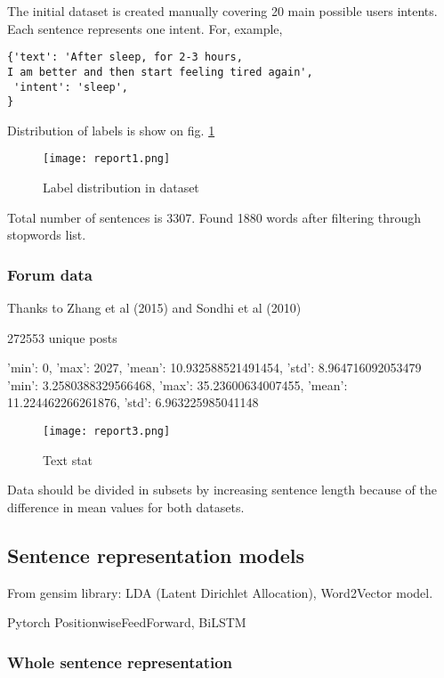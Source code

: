 \documentclass[11pt]{article}
\begin{document}
The initial dataset is created manually covering 20 main possible users intents. Each sentence represents one intent. For, example,

\begin{lstlisting}
{'text': 'After sleep, for 2-3 hours, 
I am better and then start feeling tired again',
 'intent': 'sleep',
}
\end{lstlisting}

Distribution of labels is show on fig. \ref{figure:name}

 \begin{figure}[h]
 	\centering
 	\texttt{[image: report1.png]}
	\caption{Label distribution in dataset}
 \label{figure:name}
 \end{figure}


Total number of sentences is 3307. Found 1880 words after filtering through stopwords list. 

\subsubsection{Forum data}

Thanks to Zhang et al (2015) and Sondhi et al (2010) 

272553 unique posts

{'min': 0, 'max': 2027, 'mean': 10.932588521491454, 'std': 8.964716092053479}
{'min': 3.2580388329566468, 'max': 35.23600634007455, 'mean': 11.224462266261876, 'std': 6.963225985041148}


 \begin{figure}[h]
 	\centering
 	\texttt{[image: report3.png]}
	\caption{Text stat}\label{visina8}
 \end{figure}

Data should be divided in subsets by increasing sentence length because of the difference in mean values for both datasets.


\subsection{Sentence representation models}

From gensim library: LDA (Latent Dirichlet Allocation), Word2Vector model.

Pytorch PositionwiseFeedForward, BiLSTM

\subsubsection{Whole sentence representation}
\end{document}
